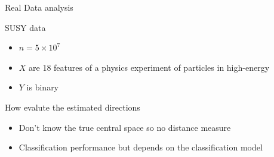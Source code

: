 \documentclass[ignorenonframetext,]{beamer}
\providecommand{\tightlist}{%
  \setlength{\itemsep}{0pt}\setlength{\parskip}{0pt}}
\begin{document}
\begin{frame}{Real Data analysis}

\begin{block}{SUSY data}

\begin{itemize}
\tightlist
\item
  \(n = 5 \times 10^7\)
\item
  \(X\) are 18 features of a physics experiment of particles in
  high-energy
\item
  \(Y\) is binary
\end{itemize}

\end{block}

\begin{block}{How evalute the estimated directions}

\begin{itemize}
\tightlist
\item
  Don't know the true central space so no distance measure
\item
  Classification performance but depends on the classification model
\end{itemize}

\end{block}

\end{frame}
\end{document}
